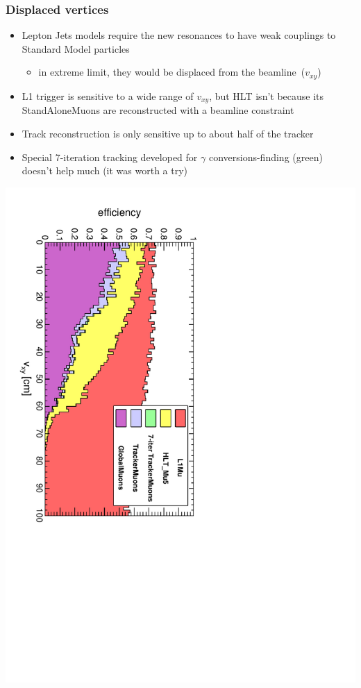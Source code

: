 \documentclass[compress]{beamer}
\begin{document}
\begin{frame}
\frametitle{Displaced vertices}

\begin{itemize}
\item Lepton Jets models require the new resonances to have weak couplings to Standard Model particles
\begin{itemize}
\item in extreme limit, they would be displaced from the \mbox{beamline ($v_{xy}$)\hspace{-1 cm}}
\end{itemize}
\item L1 trigger is sensitive to a wide range of $v_{xy}$, but HLT
  isn't because its StandAloneMuons are reconstructed with a beamline
  constraint
\item Track reconstruction is only sensitive up to about half of the
  tracker
\item Special 7-iteration tracking developed for $\gamma$ conversions-finding (green) doesn't help much (it was worth a try)
\end{itemize}

\begin{center}
\includegraphics[height=0.7\linewidth, angle=90]{dispvert.pdf}
\end{center}
\end{frame}
\end{document}
